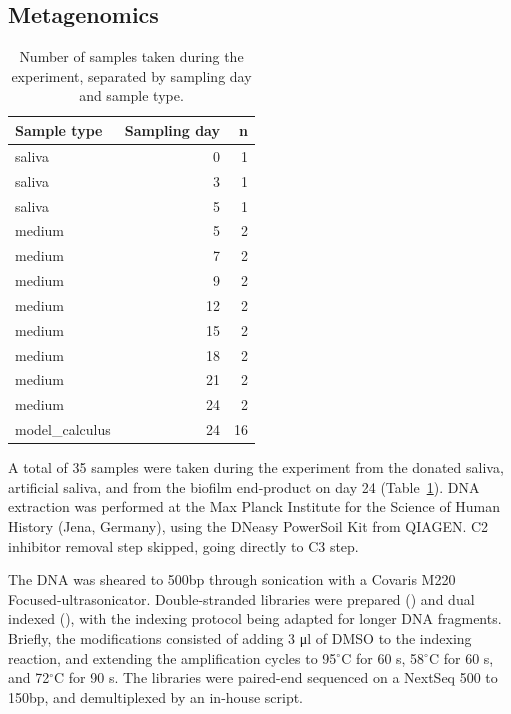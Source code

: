 \documentclass[
  b5paper,
]{book}
\begin{document}
\subsection{Metagenomics}\label{metagenomics}

\begin{longtable}[]{@{}lrr@{}}

\caption{\label{tbl-dna-samples}Number of samples taken during the
experiment, separated by sampling day and sample type.}

\tabularnewline

\toprule\noalign{}
Sample type & Sampling day & n \\
\midrule\noalign{}
\endhead
\bottomrule\noalign{}
\endlastfoot
saliva & 0 & 1 \\
saliva & 3 & 1 \\
saliva & 5 & 1 \\
medium & 5 & 2 \\
medium & 7 & 2 \\
medium & 9 & 2 \\
medium & 12 & 2 \\
medium & 15 & 2 \\
medium & 18 & 2 \\
medium & 21 & 2 \\
medium & 24 & 2 \\
model\_calculus & 24 & 16 \\

\end{longtable}

A total of 35 samples were taken during the experiment from the donated
saliva, artificial saliva, and from the biofilm end-product on day 24
(Table~\ref{tbl-dna-samples}). DNA extraction was performed at the Max
Planck Institute for the Science of Human History (Jena, Germany), using
the DNeasy PowerSoil Kit from QIAGEN. C2 inhibitor removal step skipped,
going directly to C3 step.

The DNA was sheared to 500bp through sonication with a Covaris M220
Focused-ultrasonicator. Double-stranded libraries were prepared
() and dual indexed
(),
with the indexing protocol being adapted for longer DNA fragments.
Briefly, the modifications consisted of adding 3 μl of DMSO to the
indexing reaction, and extending the amplification cycles to
95\(^{\circ}\)C for 60 s, 58\(^{\circ}\)C for 60 s, and 72\(^{\circ}\)C
for 90 s. The libraries were paired-end sequenced on a NextSeq 500 to
150bp, and demultiplexed by an in-house script.
\end{document}
